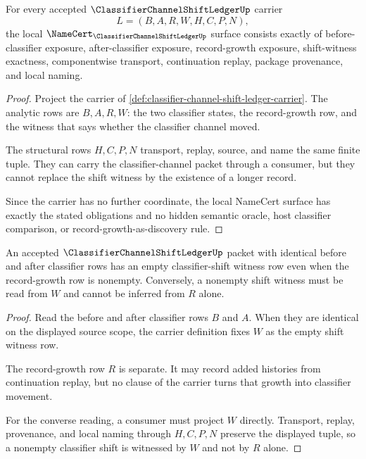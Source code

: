 \begin{theorem}\label{thm:classifier-channel-shift-ledger-namecert-obligations}
For every accepted $\ClassifierChannelShiftLedgerUp$ carrier
$$
L=(B,A,R,W,H,C,P,N),
$$
the local $\NameCert_{\ClassifierChannelShiftLedgerUp}$ surface consists exactly of before-classifier exposure, after-classifier exposure, record-growth exposure, shift-witness exactness, componentwise transport, continuation replay, package provenance, and local naming.
\end{theorem}
\begin{proof}
Project the carrier of \autoref{def:classifier-channel-shift-ledger-carrier}. The analytic rows are $B,A,R,W$: the two classifier states, the record-growth row, and the witness that says whether the classifier channel moved.

The structural rows $H,C,P,N$ transport, replay, source, and name the same finite tuple. They can carry the classifier-channel packet through a consumer, but they cannot replace the shift witness by the existence of a longer record.

Since the carrier has no further coordinate, the local NameCert surface has exactly the stated obligations and no hidden semantic oracle, host classifier comparison, or record-growth-as-discovery rule.
\end{proof}

\begin{theorem}\label{thm:classifier-channel-shift-ledger-record-growth-separation}
An accepted $\ClassifierChannelShiftLedgerUp$ packet with identical before and after classifier rows has an empty classifier-shift witness row even when the record-growth row is nonempty. Conversely, a nonempty shift witness must be read from $W$ and cannot be inferred from $R$ alone.
\end{theorem}
\begin{proof}
Read the before and after classifier rows $B$ and $A$. When they are identical on the displayed source scope, the carrier definition fixes $W$ as the empty shift witness row.

The record-growth row $R$ is separate. It may record added histories from continuation replay, but no clause of the carrier turns that growth into classifier movement.

For the converse reading, a consumer must project $W$ directly. Transport, replay, provenance, and local naming through $H,C,P,N$ preserve the displayed tuple, so a nonempty classifier shift is witnessed by $W$ and not by $R$ alone.
\end{proof}

